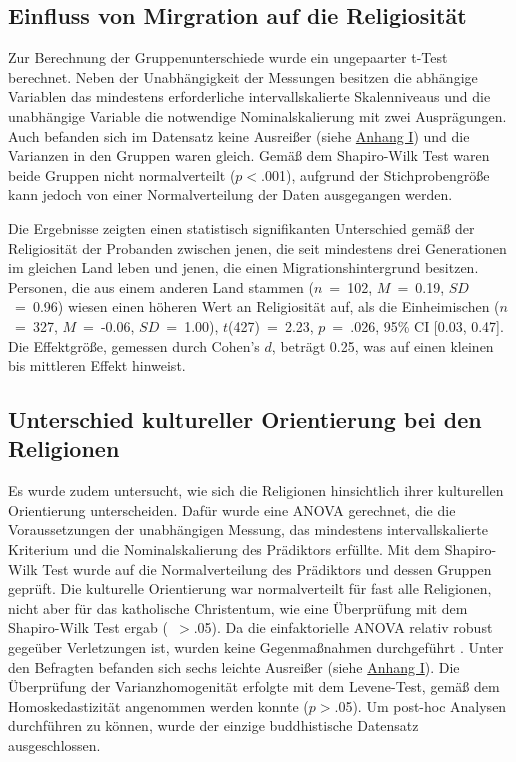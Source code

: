 \subsection{Einfluss von Mirgration auf die Religiosität}   \label{subsec_4.3.1}
Zur Berechnung der Gruppenunterschiede wurde ein ungepaarter t-Test berechnet. Neben der Unabhängigkeit der Messungen besitzen die abhängige Variablen das mindestens erforderliche intervallskalierte Skalenniveaus und die unabhängige Variable die notwendige Nominalskalierung mit zwei Ausprägungen. Auch befanden sich im Datensatz keine Ausreißer (siehe \hyperref [Explo_Voraussetzungen]{Anhang I}) und die Varianzen in den Gruppen waren gleich. Gemäß dem Shapiro-Wilk Test waren beide Gruppen nicht normalverteilt ($p<$.001), aufgrund der Stichprobengröße kann jedoch von einer Normalverteilung der Daten ausgegangen werden.

Die Ergebnisse zeigten einen statistisch signifikanten Unterschied gemäß der Religiosität der Probanden zwischen jenen, die seit mindestens drei Generationen im gleichen Land leben und jenen, die einen Migrationshintergrund besitzen. Personen, die aus einem anderen Land stammen ($n$~=~102, $M$~=~0.19, $SD$~=~0.96) wiesen einen höheren Wert an Religiosität auf, als die Einheimischen ($n$~=~327, $M$~=~-0.06, $SD$~=~1.00), $t$(427)~=~2.23, $p$~=~.026, 95\% CI [0.03, 0.47]. Die Effektgröße, gemessen durch Cohen's $d$, beträgt 0.25, was auf einen kleinen bis mittleren Effekt hinweist.


\subsection{Unterschied kultureller Orientierung bei den Religionen}   \label{subsec_4.3.2}
Es wurde zudem untersucht, wie sich die Religionen hinsichtlich ihrer kulturellen Orientierung unterscheiden. Dafür wurde eine ANOVA gerechnet, die die Voraussetzungen der unabhängigen Messung, das mindestens intervallskalierte Kriterium und die Nominalskalierung des Prädiktors erfüllte. Mit dem Shapiro-Wilk Test wurde auf die Normalverteilung des Prädiktors und dessen Gruppen geprüft. Die kulturelle Orientierung war normalverteilt für fast alle Religionen, nicht aber für das katholische Christentum, wie eine Überprüfung mit dem Shapiro-Wilk Test ergab (\textalpha~$>$.05). Da die einfaktorielle ANOVA relativ robust gegeüber Verletzungen ist, wurden keine Gegenmaßnahmen durchgeführt \parencite{SchmiderEtAl2010}. Unter den Befragten befanden sich sechs leichte Ausreißer (siehe \hyperref [Explo_Voraussetzungen]{Anhang I}). Die Überprüfung der Varianzhomogenität erfolgte mit dem Levene-Test, gemäß dem Homoskedastizität angenommen werden konnte ($p>$.05). Um post-hoc Analysen durchführen zu können, wurde der einzige buddhistische Datensatz ausgeschlossen.


